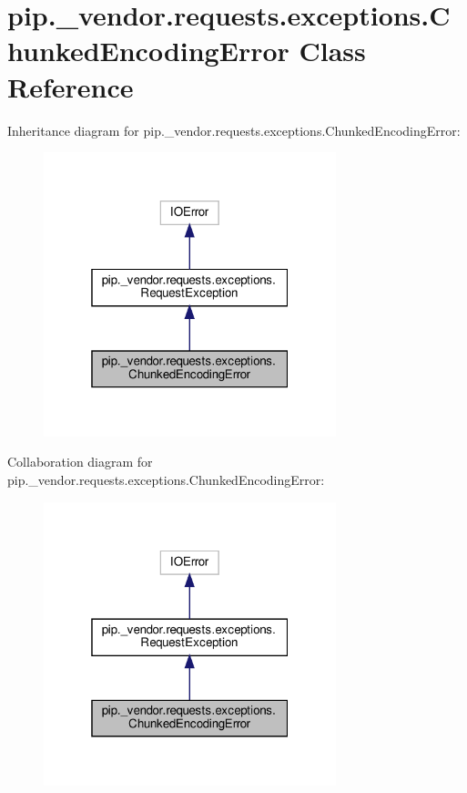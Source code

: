 \hypertarget{classpip_1_1__vendor_1_1requests_1_1exceptions_1_1ChunkedEncodingError}{}\section{pip.\+\_\+vendor.\+requests.\+exceptions.\+Chunked\+Encoding\+Error Class Reference}
\label{classpip_1_1__vendor_1_1requests_1_1exceptions_1_1ChunkedEncodingError}


Inheritance diagram for pip.\+\_\+vendor.\+requests.\+exceptions.\+Chunked\+Encoding\+Error\+:
\nopagebreak
\begin{figure}[H]
\begin{center}
\leavevmode
\includegraphics[width=241pt]{classpip_1_1__vendor_1_1requests_1_1exceptions_1_1ChunkedEncodingError__inherit__graph}
\end{center}
\end{figure}


Collaboration diagram for pip.\+\_\+vendor.\+requests.\+exceptions.\+Chunked\+Encoding\+Error\+:
\nopagebreak
\begin{figure}[H]
\begin{center}
\leavevmode
\includegraphics[width=241pt]{classpip_1_1__vendor_1_1requests_1_1exceptions_1_1ChunkedEncodingError__coll__graph}
\end{center}
\end{figure}

